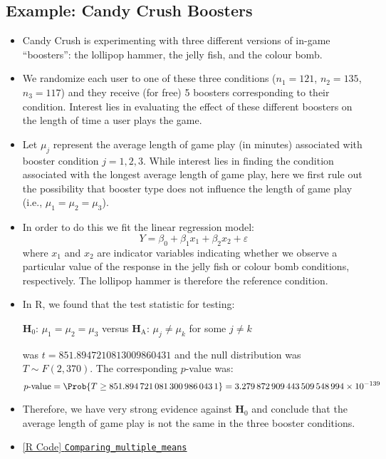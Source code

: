 \subsection{Example: Candy Crush Boosters}
\begin{itemize}
      \item Candy Crush is experimenting with three different versions of
            in-game ``boosters'': the lollipop hammer, the jelly fish, and the colour bomb.
      \item We randomize each user to one of these three conditions ($ n_1 = 121 $,
            $ n_2 = 135 $, $ n_3 = 117$) and they
            receive (for free) 5
            boosters corresponding to their condition.
            Interest lies in evaluating the effect
            of these different boosters on the length of time a user plays the game.
      \item Let $ \mu_j $ represent the average length of game play
            (in minutes) associated with booster condition
            $ j = 1, 2, 3 $. While interest lies in finding the condition
            associated with the longest average length
            of game play, here we first rule out the possibility
            that booster type does not influence the length
            of game play (i.e., $ \mu_1=\mu_2=\mu_3 $).
      \item In order to do this we fit the linear regression model:
            \[ Y=\beta_0+\beta_1 x_1+\beta_2 x_2+\varepsilon \]
            where $ x_1 $ and $ x_2 $ are indicator variables indicating
            whether we observe a particular value of the response in the
            jelly fish or colour bomb conditions, respectively.
            The lollipop hammer is therefore the reference condition.
      \item In R, we found that the test statistic for testing:
            \begin{tightcenter}
                  $ \mathbf{H}_0 $: $ \mu_1=\mu_2=\mu_3 $ versus $ \mathbf{H}_\text{A} $: $ \mu_j\ne \mu_k $ for some $ j\ne k $
            \end{tightcenter}
            was $ t=\num{851.8947210813009860431} $ and the null distribution was $ T \sim F(2,370) $. The corresponding
            $ p $-value was:
            \[ p\text{-value}=\Prob{T\ge \num{851.8947210813009860431}}=\num{3.279872909443509548994e-139} \]
      \item Therefore, we have very strong evidence against $ \mathbf{H}_0 $ and conclude that the average
            length of game play is not the same in the three booster conditions.
      \item \href{https://github.com/Hextical/university-notes/blob/master/year-3/semester-3/STAT 430/code/W3/Comparing_multiple_means.R}{[R Code] \texttt{Comparing\_multiple\_means}}
\end{itemize}
